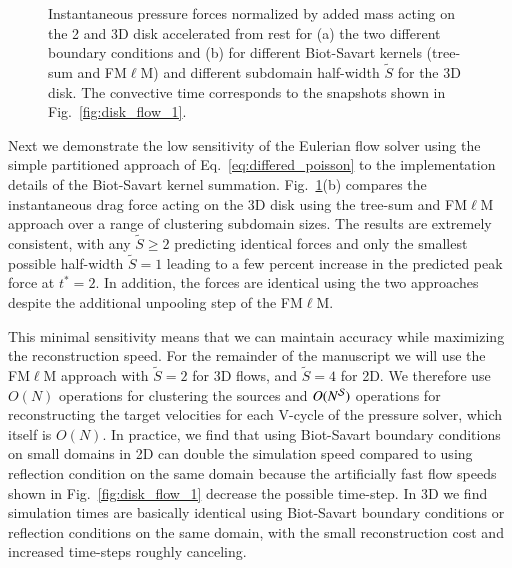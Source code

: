 \documentclass[final,1p,times]{elsarticle}
\begin{document}
\begin{figure}
\begin{subfigure}{.5\textwidth}
        \caption{}
    \end{subfigure}%
    \caption{Instantaneous pressure forces normalized by added mass acting on the 2 and 3D disk accelerated from rest for (a) the two different boundary conditions and (b) for different Biot-Savart kernels (tree-sum and FM$\ell$M) and different subdomain half-width $\tilde S$ for the 3D disk. The convective time corresponds to the snapshots shown in Fig.~\ref{fig:disk_flow_1}.}
    \label{fig:disk_forces}
\end{figure}


Next we demonstrate the low sensitivity of the Eulerian flow solver using the simple partitioned approach of Eq.~\ref{eq:differed_poisson} to the implementation details of the Biot-Savart kernel summation. Fig.~\ref{fig:disk_forces}(b) compares the instantaneous drag force acting on the 3D disk using the tree-sum and FM$\ell$M approach over a range of clustering subdomain sizes. The results are extremely consistent, with any $\tilde S \ge 2$ predicting identical forces and only the smallest possible half-width $\tilde S=1$ leading to a few percent increase in the predicted peak force at $t^*=2$. In addition, the forces are identical using the two approaches despite the additional unpooling step of the FM$\ell$M.

This minimal sensitivity means that we can maintain accuracy while maximizing the reconstruction speed. For the remainder of the manuscript we will use the FM$\ell$M approach with $\tilde S = 2$ for 3D flows, and $\tilde S = 4$ for 2D. We therefore use $O(N)$ operations for clustering the sources and $O(N^{\cal S})$ operations for reconstructing the target velocities for each V-cycle of the pressure solver, which itself is $O(N)$. In practice, we find that using Biot-Savart boundary conditions on small domains in 2D can double the simulation speed compared to using reflection condition on the same domain because the artificially fast flow speeds shown in Fig.~\ref{fig:disk_flow_1} decrease the possible time-step. In 3D we find simulation times are basically identical using Biot-Savart boundary conditions or reflection conditions on the same domain, with the small reconstruction cost and increased time-steps roughly canceling.
\end{document}
